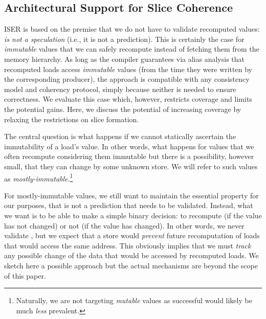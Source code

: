 
\subsection{Architectural Support for Slice Coherence}
\label{sec:coherence}
ISER is based on the premise that we do not have to validate recomputed values: \emph{{\recomp} is not a speculation} (i.e., it is not a prediction). This is certainly the case for \emph{immutable} values that we can safely recompute instead of fetching them from the memory hierarchy. As long as the compiler guarantees via alias analysis that recomputed loads access \emph{immutable} values (from the time they were written by the corresponding producer), the approach is compatible with any consistency model and coherency protocol, simply because neither is needed to ensure correctness. We evaluate this case which, however, restricts {\recomp} coverage and limits the potential gains. Here, we discuss the potential of increasing coverage by relaxing the restrictions on slice formation.

The central question is what happens if we cannot statically ascertain the immutability of a load's value. 
In other words, what happens for values that we often recompute considering them immutable but there is a possibility, however small, that they can change by some unknown store. 
We will refer to such values as \emph{mostly-immutable}.\footnote{Naturally, we are not targeting \emph{mutable} values as successful {\recomp} would likely be much \emph{less} prevalent.}

For mostly-immutable values, we still want to maintain the essential property for our purposes, that {\recomp} is not a prediction that needs to be validated. Instead, what we want is to be able to make a simple binary decision: to recompute (if the value has not changed) or not (if the value has changed). In other words, we never validate {\recomp}, but we expect that a store would \emph{prevent} future recomputation of loads that would access the same address. 
This obviously implies that we must \emph{track} any possible change of the data that would be accessed by recomputed loads. We sketch here a possible approach but the actual mechanisms are beyond the scope of this paper.

